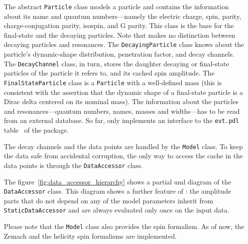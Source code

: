     The abstract \lstinline!Particle! class models a particle and contains the information about its name and quantum numbers---namely the electric charge, spin, parity, charge-conjugation parity, isospin, and G parity.
    This class is the base for the final-state and the decaying particles.
    Note that  makes no distinction between decaying particles and resonances.
    The \lstinline!DecayingParticle! class knows about the particle's dynamic-shape distribution, penetration factor, and decay channels.
    The \lstinline!DecayChannel! class, in turn, stores the daughter decaying or final-state particles of the particle it refers to, and its cached spin amplitude.
    The \lstinline!FinalStateParticle! class is a \lstinline!Particle! with a well-defined mass (this is consistent with the assertion that the dynamic shape of a final-state particle is a Dirac delta centered on its nominal mass).
    The information about the particles and resonances---quantum numbers, names, masses and widths---has to be read from an external database.
    So far,  only implements an interface to the \texttt{evt.pdl} table~\cite[p.~13]{evtgen_manual} of the  package.


    The decay channels and the data points are handled by the \lstinline!Model! class.
    To keep the data safe from accidental corruption, the only way to access the cache in the data points is through the \lstinline!DataAccessor! class.
    \begin{sidewaysfigure}
        \centering
        
        \caption{A simplified \ac{uml} diagram that shows some of the daughter classes of \lstinline!DataAccessor!.}
        \label{fig:data_accessor_hierarchy}
    \end{sidewaysfigure}
    The figure~\ref{fig:data_accessor_hierarchy} shows a partial \ac{uml} diagram of the \lstinline!DataAccessor! class.
    This diagram shows a further feature of : the amplitude parts that do not depend on any of the model parameters inherit from \lstinline!StaticDataAccessor! and are always evaluated only once on the input data.


    Please note that the \lstinline!Model! class also provides the spin formalism.
    As of now, the Zemach and the helicity spin formalisms are implemented.


